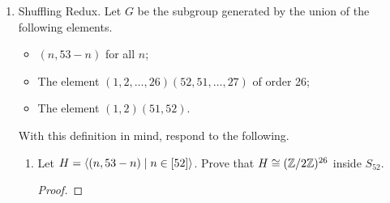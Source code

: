 \documentclass[../psets.tex]{subfiles}
\begin{document}
\begin{enumerate}
    \item Shuffling Redux. Let $G$ be the subgroup generated by the union of the following elements.
    \begin{itemize}
        \item $(n,53-n)$ for all $n$;
        \item The element $(1,2,\dots,26)(52,51,\dots,27)$ of order 26;
        \item The element $(1,2)(51,52)$.
    \end{itemize}
    With this definition in mind, respond to the following.
    \begin{enumerate}
        \item Let $H=\left\langle{(n,53-n)\mid n\in[52]}\right\rangle$. Prove that $H\cong(\mathbb{Z}/2\mathbb{Z})^{26}$ inside $S_{52}$.
        \begin{proof}

            



\end{proof}
\end{enumerate}
\end{enumerate}
\end{document}
